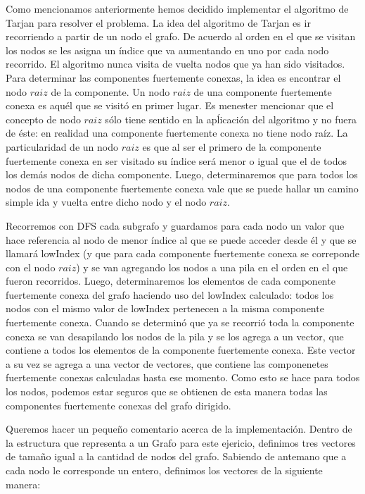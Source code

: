 \quad Como mencionamos anteriormente hemos decidido implementar el algoritmo de Tarjan para resolver el problema. La idea del algoritmo de Tarjan es ir recorriendo a partir de un nodo el grafo. De acuerdo al orden en el que se visitan los nodos se les asigna un índice que va aumentando en uno por cada nodo recorrido. El algoritmo nunca visita de vuelta nodos que ya han sido visitados. Para determinar las componentes fuertemente conexas, la idea es encontrar el nodo $raiz$ de la componente. Un nodo $raiz$ de una componente fuertemente conexa es aquél que se visitó en primer lugar. Es menester mencionar que el concepto de nodo $raiz$ sólo tiene sentido en la apĺicación del algoritmo y no fuera de éste: en realidad una componente fuertemente conexa no tiene nodo raíz. La particularidad de un nodo $raiz$ es que al ser el primero de la componente fuertemente conexa en ser visitado su índice será menor o igual que el de todos los demás nodos de dicha componente. Luego, determinaremos que para todos los nodos de una componente fuertemente conexa vale que se puede hallar un camino simple ida y vuelta entre dicho nodo y el nodo $raiz$. 

\quad Recorremos con DFS cada subgrafo y guardamos para cada nodo un valor que hace referencia al nodo de menor índice al que se puede acceder desde él y que se llamará lowIndex (y que para cada componente fuertemente conexa se correponde con el nodo $raiz$) y se van  agregando los nodos a una pila en el orden en el que fueron recorridos. Luego, determinaremos los elementos de cada componente fuertemente conexa del grafo haciendo uso del lowIndex calculado: todos los nodos con el mismo valor de lowIndex pertenecen a la misma componente fuertemente conexa. Cuando se determinó que ya se recorrió toda la componente conexa se van desapilando los nodos de la pila y se los agrega a un vector, que contiene a todos los elementos de la componente fuertemente conexa. Este vector a su vez se agrega a una vector de vectores, que contiene las componenetes fuertemente conexas calculadas hasta ese momento.  Como esto se hace para todos los nodos, podemos estar seguros que se obtienen de esta manera todas las componentes fuertemente conexas del grafo dirigido.

\quad Queremos hacer un pequeño comentario acerca de la implementación. Dentro de la estructura que representa a un Grafo para este ejericio, definimos tres vectores de tamaño igual a la cantidad de nodos del grafo. Sabiendo de antemano que a cada nodo le corresponde un entero, definimos los vectores de la siguiente manera:

